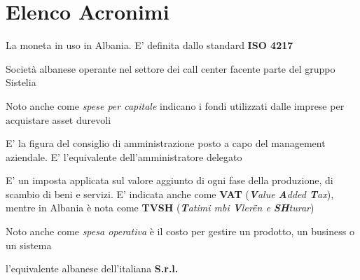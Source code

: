 \section*{Elenco Acronimi}
\begin{acronym}
\begin{multicols}{2}
		   {\newline \small La moneta in uso in Albania. E' definita dallo standard \textbf{ISO 4217}  \par}

		   {\newline \small Società albanese operante nel settore dei call center facente parte del gruppo Sistelia \par}

		   {\newline \small Noto anche come \textit{spese per capitale} indicano i fondi utilizzati dalle imprese per acquistare asset durevoli  \par}

		   {\newline \small E' la figura del consiglio di amministrazione posto a capo del management aziendale. E' l'equivalente dell'amministratore delegato  \par}

		   {\newline \small E' un imposta applicata sul valore aggiunto di ogni fase della produzione, di scambio di beni e servizi. E' indicata anche come \textbf{VAT} (\textit{\textbf{V}alue \textbf{A}dded \textbf{T}ax}), mentre in Albania è nota come \textbf{TVSH} (\textit{\textbf{T}atimi mbi \textbf{V}ler\"en e \textbf{SH}turar}) \par}

		   {\newline \small Noto anche come \textit{spesa operativa} è il costo per gestire un prodotto, un business o un sistema \par}

		   {\newline \small l'equivalente albanese dell'italiana \textbf{\ac{S.r.l.}}\par}


\end{multicols}
\end{acronym}
